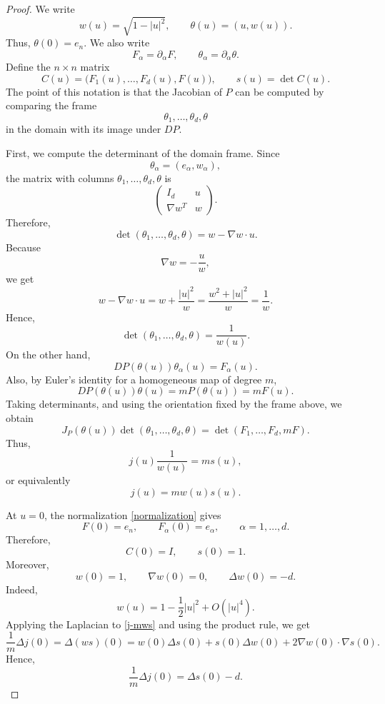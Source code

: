 \documentclass[10pt,a4paper]{amsart}
\begin{document}
\begin{proof}
We write
\[
        w(u)=\sqrt{1-|u|^2},
        \qquad
        \theta(u)=(u,w(u)).
\]
Thus, \(\theta(0)=e_n\). We also write
\[
        F_\alpha=\partial_\alpha F,
        \qquad
        \theta_\alpha=\partial_\alpha\theta.
\]
Define the \(n\times n\) matrix
\[
        C(u)=\bigl(F_1(u),\ldots,F_d(u),F(u)\bigr),
        \qquad
        s(u)=\det C(u).
\]
The point of this notation is that the Jacobian of \(P\) can be computed by
comparing the frame
\[
        \theta_1,\ldots,\theta_d,\theta
\]
in the domain with its image under \(DP\).

First, we compute the determinant of the domain frame. Since
\[
        \theta_\alpha=(e_\alpha,w_\alpha),
\]
the matrix with columns \(\theta_1,\ldots,\theta_d,\theta\) is
\[
        \begin{pmatrix}
        I_d & u\\
        \nabla w^T & w
        \end{pmatrix}.
\]
Therefore,
\[
        \det(\theta_1,\ldots,\theta_d,\theta)
        =
        w-\nabla w\cdot u.
\]
Because
\[
        \nabla w=-\frac{u}{w},
\]
we get
\[
        w-\nabla w\cdot u
        =
        w+\frac{|u|^2}{w}
        =
        \frac{w^2+|u|^2}{w}
        =
        \frac1w.
\]
Hence,
\[
        \det(\theta_1,\ldots,\theta_d,\theta)=\frac1{w(u)}.
\]
On the other hand,
\[
        DP(\theta(u))\theta_\alpha(u)=F_\alpha(u).
\]
Also, by Euler's identity for a homogeneous map of degree \(m\),
\[
        DP(\theta(u))\theta(u)=mP(\theta(u))=mF(u).
\]
Taking determinants, and using the orientation fixed by the frame above, we
obtain
\[
        J_P(\theta(u))\det(\theta_1,\ldots,\theta_d,\theta)
        =
        \det(F_1,\ldots,F_d,mF).
\]
Thus,
\[
        j(u)\frac1{w(u)}=ms(u),
\]
or equivalently
\begin{equation}\label{j-mws}
        j(u)=mw(u)s(u).
\end{equation}

At \(u=0\), the normalization \eqref{normalization} gives
\[
        F(0)=e_n,\qquad F_\alpha(0)=e_\alpha,\qquad \alpha=1,\ldots,d.
\]
Therefore,
\[
        C(0)=I,
        \qquad
        s(0)=1.
\]
Moreover,
\[
        w(0)=1,
        \qquad
        \nabla w(0)=0,
        \qquad
        \Delta w(0)=-d.
\]
Indeed,
\[
        w(u)=1-\frac12|u|^2+O(|u|^4).
\]
Applying the Laplacian to \eqref{j-mws} and using the product rule, we get
\[
        \frac1m\Delta j(0)
        =
        \Delta(ws)(0)
        =
        w(0)\Delta s(0)+s(0)\Delta w(0)+2\nabla w(0)\cdot\nabla s(0).
\]
Hence,
\begin{equation}\label{Deltaj-Deltas}
        \frac1m\Delta j(0)=\Delta s(0)-d.
\end{equation}


\end{proof}
\end{document}
